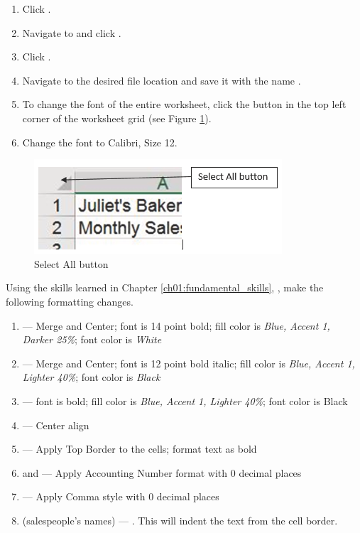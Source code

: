 \begin{enumerate}
	\item Click .
	\item Navigate to  and click .
	\item Click .
	\item Navigate to the desired file location and save it with the name .
	\item To change the font of the entire worksheet, click the  button in the top left corner of the worksheet grid (see Figure \ref{02:fig41}).
	\item Change the font to Calibri, Size 12.
\end{enumerate}

\begin{figure}[H]
	\centering
	\includegraphics[width=\maxwidth{.95\linewidth}]{gfx/ch02_fig41}
	\caption{Select All button}
	\label{02:fig41}
\end{figure}

Using the skills learned in Chapter \ref{ch01:fundamental_skills}, , make the following formatting changes.

\begin{enumerate}
	\item {} --- Merge and Center; font is 14 point bold; fill color is \textit{Blue, Accent 1, Darker 25\%}; font color is \textit{White}
	\item {} --- Merge and Center; font is 12 point bold italic; fill color is \textit{Blue, Accent 1, Lighter 40\%}; font color is \textit{Black}
	\item {} --- font is bold; fill color is \textit{Blue, Accent 1, Lighter 40\%}; font color is Black
	\item {} --- Center align
	\item {} --- Apply Top Border to the cells; format text as bold
	\item {} and  --- Apply Accounting Number format with $ 0 $ decimal places
	\item {} --- Apply Comma style with $ 0 $ decimal places
	\item {} (salespeople's names) --- . This will indent the text from the cell border.
\end{enumerate}

